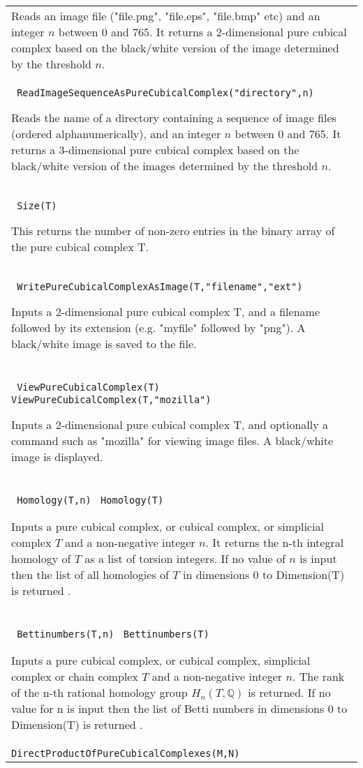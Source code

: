 \documentclass[a4paper,11pt]{report}
\begin{document}
{\begin{center}
\begin{tabular}{|l|}
 Reads an image file ("file.png", "file.eps", "file.bmp" etc) and an integer $n$ between 0 and 765. It returns a 2-dimensional pure cubical complex based on
the black/white version of the image determined by the threshold $n$. \\
 \index{ReadImageSequenceAsPureCubicalComplex} \texttt{ ReadImageSequenceAsPureCubicalComplex("directory",n)} 

 Reads the name of a directory containing a sequence of image files (ordered
alphanumerically), and an integer $n$ between 0 and 765. It returns a 3-dimensional pure cubical complex based on
the black/white version of the images determined by the threshold $n$. \\
 \texttt{ Size(T)} 

 This returns the number of non-zero entries in the binary array of the pure
cubical complex T. \\
 \index{WritePureCubicalComplexAsImage} \texttt{ WritePureCubicalComplexAsImage(T,"filename","ext")} 

 Inputs a 2-dimensional pure cubical complex T, and a filename followed by its
extension (e.g. "myfile" followed by "png"). A black/white image is saved to
the file. \\
 \index{ViewPureCubicalComplex} \texttt{ ViewPureCubicalComplex(T)} \texttt{ ViewPureCubicalComplex(T,"mozilla")} 

 Inputs a 2-dimensional pure cubical complex T, and optionally a command such
as "mozilla" for viewing image files. A black/white image is displayed. \\
 \index{Homology} \texttt{ Homology(T,n)} \texttt{ Homology(T)} 

 Inputs a pure cubical complex, or cubical complex, or simplicial complex $T$ and a non-negative integer $n$. It returns the n-th integral homology of $T$ as a list of torsion integers. If no value of $n$ is input then the list of all homologies of $T$ in dimensions 0 to Dimension(T) is returned . \\
 \index{Bettinumbers} \texttt{ Bettinumbers(T,n)} \texttt{ Bettinumbers(T)} 

 Inputs a pure cubical complex, or cubical complex, simplicial complex or chain
complex $T$ and a non-negative integer $n$. The rank of the n-th rational homology group $H_n(T,\mathbb Q)$ is returned. If no value for n is input then the list of Betti numbers in
dimensions 0 to Dimension(T) is returned . \\
 \index{DirectProductOfPureCubicalComplexes} \texttt{DirectProductOfPureCubicalComplexes(M,N)} 


\end{tabular}
\end{center}}
\end{document}
